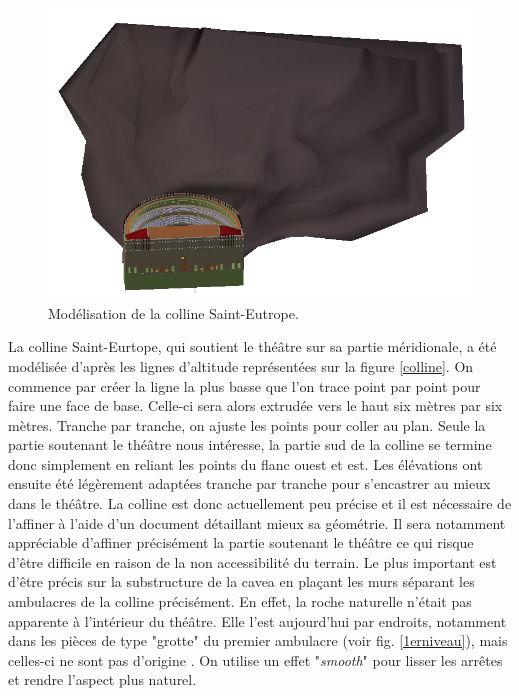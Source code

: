 \begin{figure}[!h]
	\centering
	\includegraphics[width=\textwidth]{images/modColline}
	\caption{Modélisation de la colline Saint-Eutrope.} 
	\label{modColline} 
\end{figure}

La colline Saint-Eurtope, qui soutient le théâtre sur sa partie méridionale, a été modélisée d'après les lignes d'altitude représentées sur la figure \ref{colline}. On commence par créer la ligne la plus basse que l'on trace point par point pour faire une face de base. Celle-ci sera alors extrudée vers le haut six mètres par six mètres. Tranche par tranche, on ajuste les points pour coller au plan. Seule la partie soutenant le théâtre nous intéresse, la partie sud de la colline se termine donc simplement en reliant les points du flanc ouest et est. Les élévations ont ensuite été légèrement adaptées tranche par tranche pour s'encastrer au mieux dans le théâtre. La colline est donc actuellement peu précise et il est nécessaire de l'affiner à l'aide d'un document détaillant mieux sa géométrie. Il sera notamment appréciable d'affiner précisément la partie soutenant le théâtre ce qui risque d'être difficile en raison de la non accessibilité du terrain. Le plus important est d'être précis sur la substructure de la  \gls{cavea} en plaçant les murs séparant les  \glspl{ambulacre} de la colline précisément. En effet, la roche naturelle n'était pas apparente à l'intérieur du théâtre. Elle l'est aujourd'hui par endroits, notamment dans les pièces de type "grotte" du premier \gls{ambulacre} (voir fig. \ref{1erniveau}), mais celles-ci ne sont pas d'origine \cite[p.350]{orangeTxt}. On utilise un effet "\textit{smooth}" pour lisser les arrêtes et rendre l'aspect plus naturel.


